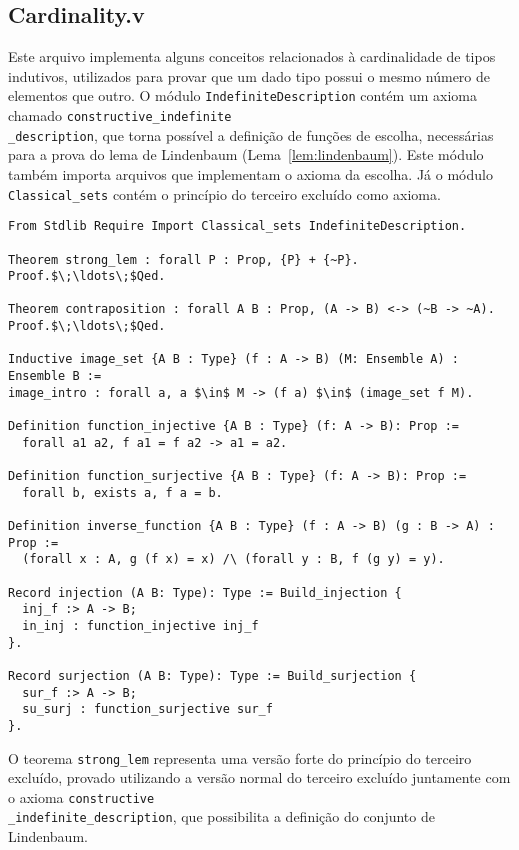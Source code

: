     \subsection{Cardinality.v}\label{sec:cardinality}

        Este arquivo implementa alguns conceitos relacionados à cardinalidade de tipos indutivos, utilizados para provar que um dado tipo possui o mesmo número de elementos que outro. O módulo \texttt{IndefiniteDescription} contém um axioma chamado \texttt{constructive\_indefinite\\\_description}, que torna possível a definição de funções de escolha, necessárias para a prova do lema de Lindenbaum (Lema~\ref{lem:lindenbaum}). Este módulo também importa arquivos que implementam o axioma da escolha. Já o módulo \texttt{Classical\_sets} contém o princípio do terceiro excluído como axioma.

        \begin{lstlisting}[name=LFI, frame=single, language=coq]
From Stdlib Require Import Classical_sets IndefiniteDescription.

Theorem strong_lem : forall P : Prop, {P} + {~P}.
Proof.$\;\ldots\;$Qed. 

Theorem contraposition : forall A B : Prop, (A -> B) <-> (~B -> ~A).
Proof.$\;\ldots\;$Qed.

Inductive image_set {A B : Type} (f : A -> B) (M: Ensemble A) : Ensemble B :=
image_intro : forall a, a $\in$ M -> (f a) $\in$ (image_set f M).

Definition function_injective {A B : Type} (f: A -> B): Prop :=
  forall a1 a2, f a1 = f a2 -> a1 = a2.

Definition function_surjective {A B : Type} (f: A -> B): Prop :=
  forall b, exists a, f a = b.
  
Definition inverse_function {A B : Type} (f : A -> B) (g : B -> A) : Prop :=
  (forall x : A, g (f x) = x) /\ (forall y : B, f (g y) = y).

Record injection (A B: Type): Type := Build_injection {
  inj_f :> A -> B;
  in_inj : function_injective inj_f
}.

Record surjection (A B: Type): Type := Build_surjection {
  sur_f :> A -> B;
  su_surj : function_surjective sur_f
}.
          \end{lstlisting}

          O teorema \texttt{strong\_lem} representa uma versão forte do princípio do terceiro excluído, provado utilizando a versão normal do terceiro excluído juntamente com o axioma \texttt{constructive\\\_indefinite\_description}, que possibilita a definição do conjunto de Lindenbaum.
          
